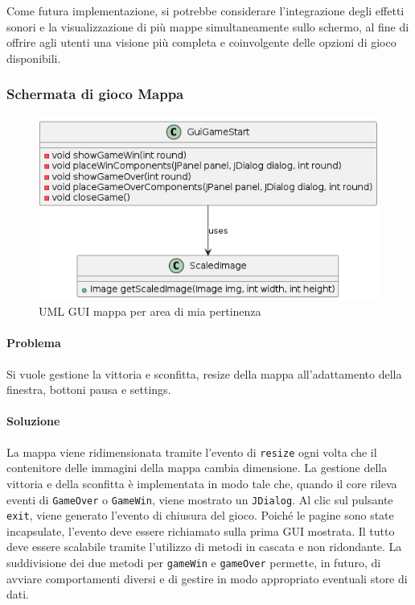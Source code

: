 \documentclass[a4paper,12pt]{report}
\begin{document}
Come futura implementazione, si potrebbe considerare l'integrazione degli effetti sonori e la visualizzazione di più mappe simultaneamente sullo schermo, al fine di offrire agli utenti una visione più completa e coinvolgente delle opzioni di gioco disponibili.

\subsubsection{Schermata di gioco Mappa}

\begin{figure}[H]
    \centering
    \includegraphics[scale=1]{GuiGameStart}
    \caption{UML GUI mappa per area di mia pertinenza}
    \label{fig:gameStart}
\end{figure}

\paragraph{Problema} Si vuole gestione la vittoria e sconfitta, resize della mappa all'adattamento della finestra, bottoni pausa e settings.
\paragraph{Soluzione} La mappa viene ridimensionata tramite l'evento di \texttt{resize} ogni volta che il contenitore delle immagini della mappa cambia dimensione. La gestione della vittoria e della sconfitta è implementata in modo tale che, quando il core rileva eventi di \texttt{GameOver} o \texttt{GameWin}, viene mostrato un \texttt{JDialog}. Al clic sul pulsante \texttt{exit}, viene generato l'evento di chiusura del gioco. Poiché le pagine sono state incapsulate, l'evento deve essere richiamato sulla prima GUI mostrata. Il tutto deve essere scalabile tramite l'utilizzo di metodi in cascata e non ridondante. La suddivisione dei due metodi per \texttt{gameWin} e \texttt{gameOver} permette, in futuro, di avviare comportamenti diversi e di gestire in modo appropriato eventuali store di dati.
\end{document}
